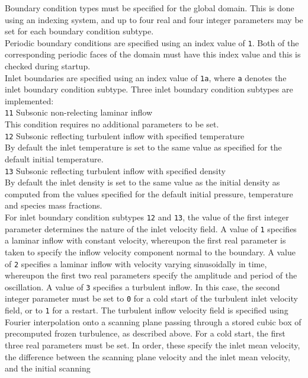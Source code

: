 \documentclass[dvips]{article}
\begin{document}
\noindent
Boundary condition types must be specified for the global domain.  This
is done using an indexing system, and up to four real and four integer
parameters may be set for each boundary condition subtype.\\[1mm]
Periodic boundary conditions are
specified using an index value of {\tt 1}.  Both of the corresponding periodic
faces of the domain must have this index value and this is checked
during startup.\\[1mm]
Inlet boundaries are specified using an index value of
{\tt 1a}, where {\tt a} denotes the inlet boundary condition subtype.
Three inlet boundary condition subtypes are implemented:\\[1mm] 
{\tt 11} Subsonic non-relecting laminar inflow \\
This condition requires no additional parameters to be set.\\[1mm]
{\tt 12} Subsonic reflecting turbulent inflow with specified temperature \\
By default the inlet temperature is set to the same value as specified
for the default initial temperature.\\[1mm]
{\tt 13} Subsonic reflecting turbulent inflow with specified density \\
By default the inlet density is set to the same value as the 
initial density as computed from the values specified for the default
initial pressure, temperature and species mass fractions.\\[2mm]
For inlet boundary condition subtypes {\tt 12} and {\tt 13}, the value of
the first integer parameter
determines the nature of the inlet velocity field.
A value of {\tt 1}
specifies a laminar inflow with constant velocity, whereupon the first real
parameter is taken to
specify the inflow velocity component normal to the boundary.
A value of {\tt 2} specifies a laminar inflow with velocity varying
sinusoidally in time, whereupon the first two real parameters specify the
amplitude and period of the oscillation.  A value of {\tt 3} specifies a
turbulent inflow.  In this case, the second integer parameter must be set
to {\tt 0} for a
cold start of the turbulent inlet velocity field, or to {\tt 1} for a restart.
The turbulent inflow velocity field is specified using Fourier
interpolation onto a scanning plane passing through a stored cubic box of
precomputed frozen turbulence, as described above.  
For a cold start, the first three real parameters must be set.  In
order, these specify the inlet mean velocity, the difference between the
scanning plane velocity and the inlet mean velocity, and the initial scanning
\end{document}
